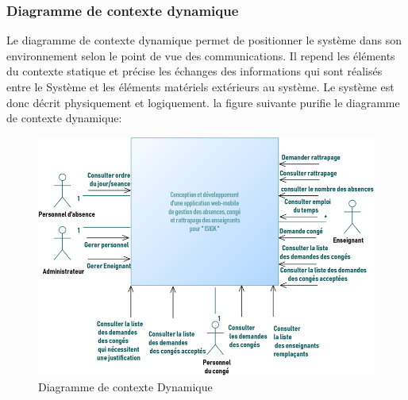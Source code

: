 \documentclass[12 pt ]{report}
\begin{document}
\subsubsection{ Diagramme de contexte dynamique }
Le diagramme de contexte dynamique permet de positionner le système dans son environnement selon le point de vue des communications. Il repend les éléments du contexte statique et précise les échanges des informations qui sont réalisés entre le 
Système et les éléments matériels extérieurs au système. Le système est donc décrit physiquement et logiquement.
\newpage
la figure suivante purifie le diagramme de contexte dynamique:
\begin{figure}[h]
\begin{center}

\includegraphics[width= 16 cm ,height= 12 cm]{d.png}
\caption{ Diagramme de contexte Dynamique}
\end{center}

\end{figure}
\end{document}

